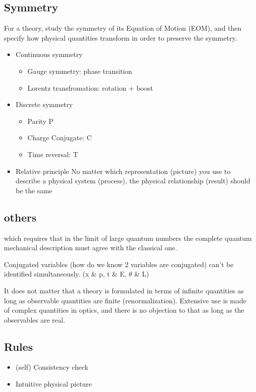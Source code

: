 \subsection{Symmetry}
For a theory, study the symmetry of its Equation of Motion (EOM), and then 
specify how physical quantities transform in order to preserve the symmetry.
\begin{itemize}
    \item Continuous symmetry
	\begin{itemize}
	    \item Gauge symmetry: phase transition
	    \item Lorentz transfromation: rotation + boost
	\end{itemize}
    \item Discrete symmetry
	\begin{itemize}
	    \item Parity P
	    \item Charge Conjugate: C
	    \item Time reversal: T
	\end{itemize}
    \item Relative principle
	No matter which representation (picture) you use to describe a physical
	system (process), the physical relationship (result) should be the same
\end{itemize}




\subsection{others}
\begin{description}[style=nextline]
    \item[correspondence principle]
	which requires that in the limit of large quantum numbers the 
	complete quantum mechanical description must agree with the 
	classical one.
    \item[Uncertainty principle]
	Conjugated variables (how do we know 2 variables are conjugated) can't 
	be identified simultaneously.  (x \& p, t \& E, $\theta$ \& L)
    \item[Practical principle]
	It does not matter that a theory is formulated in terms of infinite 
	quantities as long as observable quantities are finite (renormalization). 
	Extensive use is made of complex quantities in optics, and there is no 
	objection to that as long as the observables are real.
\end{description}

\subsection{Rules}
\begin{itemize}
    \item (self) Consistency check
    \item Intuitive physical picture
\end{itemize}
